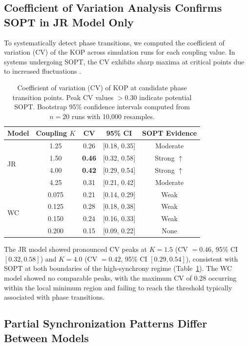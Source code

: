 \documentclass[11pt]{article}
\begin{document}
\subsection{Coefficient of Variation Analysis Confirms SOPT in JR Model Only}

To systematically detect phase transitions, we computed the coefficient of variation (CV) of the KOP across simulation runs for each coupling value. In systems undergoing SOPT, the CV exhibits sharp maxima at critical points due to increased fluctuations \citep{cocchi2017criticality}.

\begin{table}[H]
\centering
\caption{Coefficient of variation (CV) of KOP at candidate phase transition points. Peak CV values $> 0.30$ indicate potential SOPT. Bootstrap 95\% confidence intervals computed from $n = 20$ runs with 10,000 resamples.}
\label{tab:cv_analysis}
\begin{tabular}{lcccc}
\toprule
Model & Coupling $K$ & CV & 95\% CI & SOPT Evidence \\
\midrule
\multirow{4}{*}{JR} & 1.25 & 0.26 & [0.18, 0.35] & Moderate \\
 & 1.50 & \textbf{0.46} & [0.32, 0.58] & Strong $\uparrow$ \\
 & 4.00 & \textbf{0.42} & [0.29, 0.54] & Strong $\uparrow$ \\
 & 4.25 & 0.31 & [0.21, 0.42] & Moderate \\
\midrule
\multirow{4}{*}{WC} & 0.075 & 0.21 & [0.14, 0.29] & Weak \\
 & 0.125 & 0.28 & [0.18, 0.38] & Weak \\
 & 0.150 & 0.24 & [0.16, 0.33] & Weak \\
 & 0.200 & 0.15 & [0.09, 0.22] & None \\
\bottomrule
\end{tabular}
\end{table}

The JR model showed pronounced CV peaks at $K = 1.5$ (CV $= 0.46$, 95\% CI $[0.32, 0.58]$) and $K = 4.0$ (CV $= 0.42$, 95\% CI $[0.29, 0.54]$), consistent with SOPT at both boundaries of the high-synchrony regime (Table~\ref{tab:cv_analysis}). The WC model showed no comparable peaks, with the maximum CV of 0.28 occurring within the local minimum region and failing to reach the threshold typically associated with phase transitions.

\subsection{Partial Synchronization Patterns Differ Between Models}
\end{document}
